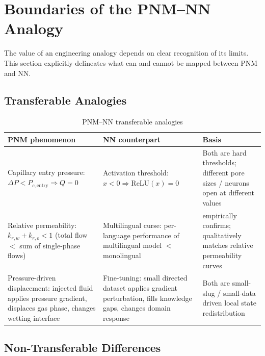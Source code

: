 \documentclass[11pt,a4paper]{article}
\begin{document}
\section{Boundaries of the PNM--NN Analogy}
\label{sec:analogy-boundary}

The value of an engineering analogy depends on clear recognition of its limits.
This section explicitly delineates what can and cannot be mapped between PNM and NN.

\subsection{Transferable Analogies}

\begin{table}[H]
\centering
\caption{PNM--NN transferable analogies}
\small
\begin{tabular}{p{3.2cm}p{3.2cm}p{5.5cm}}
\toprule
\textbf{PNM phenomenon} & \textbf{NN counterpart} & \textbf{Basis} \\
\midrule
Capillary entry pressure: $\Delta P < P_{c,\text{entry}} \Rightarrow Q=0$ & Activation threshold: $x<0 \Rightarrow \text{ReLU}(x)=0$ & Both are hard thresholds; different pore sizes / neurons open at different values \\
\addlinespace
Relative permeability: $k_{r,w}+k_{r,o}<1$ (total flow $<$ sum of single-phase flows) & Multilingual curse: per-language performance of multilingual model $<$ monolingual & \citet{conneau2020multilingual} empirically confirms; qualitatively matches relative permeability curves \\
\addlinespace
Pressure-driven displacement: injected fluid applies pressure gradient, displaces gas phase, changes wetting interface & Fine-tuning: small directed dataset applies gradient perturbation, fills knowledge gaps, changes domain response & Both are small-slug / small-data driven local state redistribution \\
\bottomrule
\end{tabular}
\end{table}

\subsection{Non-Transferable Differences}
\end{document}
